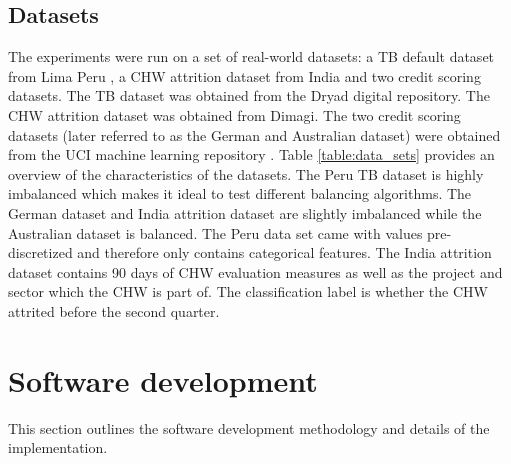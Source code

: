 \documentclass{sig-alternate-05-2015}
\begin{document}
	\subsection{Datasets}
	The experiments were run on a set of real-world datasets: a TB default dataset from Lima Peru \cite{Lackey:10356751520150601}, a CHW attrition dataset from India and two credit scoring datasets. The TB dataset was obtained from the Dryad digital repository. The CHW attrition dataset was obtained from Dimagi. The two credit scoring datasets (later referred to as the German and Australian dataset) were obtained from the UCI machine learning repository \cite{Lichman:2013}. Table \ref{table:data_sets} provides an overview of the characteristics of the datasets. The Peru TB dataset is highly imbalanced which makes it ideal to test different balancing algorithms. The German dataset and India attrition dataset are slightly imbalanced while the Australian dataset is balanced. The Peru data set came with values pre-discretized and therefore only contains categorical features. The India attrition dataset contains 90 days of CHW evaluation measures as well as the project and sector which the CHW is part of. The classification label is whether the CHW attrited before the second quarter.
	\begin{table}
		\centering
		\small
		\vspace{-8em}
		\caption{Data set summary}
		\label{table:data_sets}
		\vspace{-1em}
		\vspace{-0em}
	\end{table}
	
	\section{Software development}
	This section outlines the software development methodology and details of the implementation.
\end{document}
